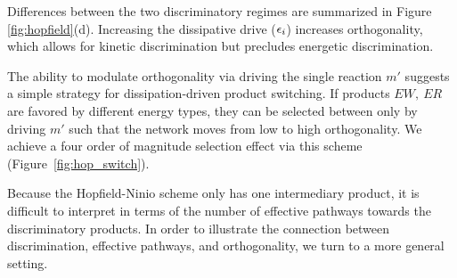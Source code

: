 Differences between the two discriminatory  regimes are summarized in Figure  \ref{fig:hopfield}(d).  Increasing the dissipative drive ($\epsilon_i$) increases orthogonality, which allows for kinetic discrimination but precludes energetic discrimination.

The ability to modulate orthogonality via driving the single reaction $m'$ suggests a simple strategy for dissipation-driven product switching.
If products $EW, \ ER$ are favored by different energy types, they can be selected between only by driving $m'$ such that the network moves from low to high orthogonality. We achieve a four order of magnitude selection effect via this scheme (Figure~\ref{fig:hop_switch}).

Because the Hopfield-Ninio scheme only has one intermediary product, it is difficult to interpret in terms of the number of effective pathways towards the discriminatory products.  In order to illustrate the connection between discrimination, effective pathways, and orthogonality, we turn to a more general setting.